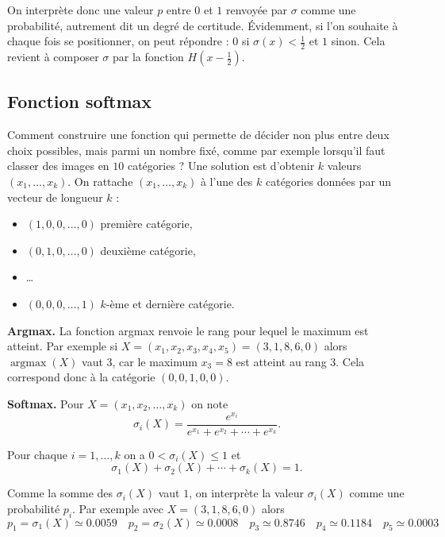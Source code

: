 \documentclass[11pt,class=report,crop=false]{standalone}
\begin{document}
On interprète donc une valeur $p$ entre $0$ et $1$ renvoyée par $\sigma$ comme une probabilité, autrement dit un degré de certitude.
Évidemment, si l'on souhaite à chaque fois se positionner, on peut répondre : $0$ si $\sigma(x) < \frac12$ et $1$ sinon.
Cela revient à composer $\sigma$ par la fonction $H(x-\frac12)$. 


\subsection{Fonction softmax}

Comment construire une fonction qui permette de décider non plus entre deux choix possibles, mais parmi un nombre fixé, comme par exemple lorsqu'il faut classer des images en $10$ catégories ?
Une solution est d'obtenir $k$ valeurs $(x_1,\ldots,x_k)$. On rattache $(x_1,\ldots,x_k)$ à l'une des $k$ catégories données par un vecteur de longueur $k$ :
\begin{itemize}
  \item $(1,0,0,\ldots,0)$ première catégorie,
  \item $(0,1,0,\ldots,0)$ deuxième catégorie,
  \item \ldots
  \item $(0,0,0,\ldots,1)$ $k$-ème et dernière catégorie.
\end{itemize}

\textbf{Argmax.}
La fonction argmax renvoie le rang pour lequel le maximum est atteint.
Par exemple si $X = (x_1,x_2,x_3,x_4,x_5) = (3,1,8,6,0)$ alors 
$\operatorname{argmax}(X)$ vaut $3$, car le maximum $x_3 = 8$ est atteint au rang $3$.
Cela correspond donc à la catégorie $(0,0,1,0,0)$.

\textbf{Softmax.}
Pour $X = (x_1,x_2,\ldots,x_k)$ on note
$$\sigma_i (X) = \frac{e^{x_i}}{ e^{x_1} + e^{x_2} + \cdots + e^{x_k}}.$$

\begin{proposition}
Pour chaque $i=1,\ldots,k$ on a 
$0 < \sigma_i(X) \le 1$ et 
$$\sigma_1(X) + \sigma_2(X) + \cdots + \sigma_k(X)=1.$$
\end{proposition}

Comme la somme des $\sigma_i(X)$ vaut $1$, on interprète la valeur $\sigma_i(X)$ comme une probabilité $p_i$.
Par exemple avec $X = (3,1,8,6,0)$ alors
$$
p_1 = \sigma_1(X) \simeq 0.0059 \quad
p_2 = \sigma_2(X) \simeq 0.0008 \quad
p_3 \simeq 0.8746 \quad
p_4 \simeq 0.1184 \quad
p_5 \simeq 0.0003$$
\end{document}
